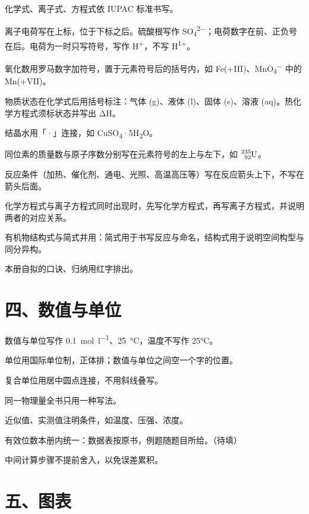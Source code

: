 \begin{fanli}
  \item 化学式、离子式、方程式依 IUPAC 标准书写。
  \item 离子电荷写在上标，位于下标之后。硫酸根写作 SO\textsubscript{4}\textsuperscript{2−}；电荷数字在前、正负号在后。电荷为一时只写符号，写作 H\textsuperscript{+}，不写 H\textsuperscript{1+}。
  \item 氧化数用罗马数字加符号，置于元素符号后的括号内，如 Fe(+III)、MnO\textsubscript{4}\textsuperscript{−} 中的 Mn(+VII)。
  \item 物质状态在化学式后用括号标注：气体 (g)、液体 (l)、固体 (s)、溶液 (aq)。热化学方程式须标状态并写出 ΔH。
  \item 结晶水用「·」连接，如 CuSO\textsubscript{4}·5H\textsubscript{2}O。
  \item 同位素的质量数与原子序数分别写在元素符号的左上与左下，如 \(\cemh{^{235}_{92}U}\)。
  \item 反应条件（加热、催化剂、通电、光照、高温高压等）写在反应箭头上下，不写在箭头后面。
  \item 化学方程式与离子方程式同时出现时，先写化学方程式，再写离子方程式，并说明两者的对应关系。
  \item 有机物结构式与简式并用：简式用于书写反应与命名，结构式用于说明空间构型与同分异构。
  \item 本册自拟的口诀、归纳用红字排出。
\end{fanli}

\section*{四、数值与单位}

\begin{fanli}
  \item 数值与单位写作 \SI{0.1}{\mole\per\litre}、\SI{25}{\degreeCelsius}，温度不写作 25°C。
  \item 单位用国际单位制，正体排；数值与单位之间空一个字的位置。
  \item 复合单位用居中圆点连接，不用斜线叠写。
  \item 同一物理量全书只用一种写法。
  \item 近似值、实测值注明条件，如温度、压强、浓度。
  \item 有效位数本册内统一：数据表按原书，例题随题目所给。（待填）
  \item 中间计算步骤不提前舍入，以免误差累积。
\end{fanli}

\section*{五、图表}

